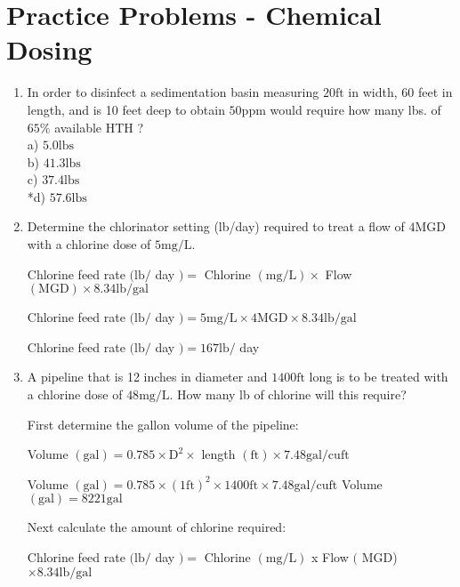 \section*{Practice Problems - Chemical Dosing} 
\begin{enumerate}

\item In order to disinfect a sedimentation basin measuring $20 \mathrm{ft}$ in width, 60 feet in length, and is 10 feet deep to obtain $50 \mathrm{ppm}$ would require how many lbs. of $65 \%$ available $\mathrm{HTH}$ ?\\
a) $5.0 \mathrm{lbs}$\\
b) $41.3 \mathrm{lbs}$\\
c) $37.4 \mathrm{lbs}$\\
*d) $57.6 \mathrm{lbs}$\\

\item Determine the chlorinator setting (lb/day) required to treat a flow of $4 \mathrm{MGD}$ with a chlorine dose of $5 \mathrm{mg} / \mathrm{L}$.

Chlorine feed rate $(\mathrm{lb} /$ day $)=$ Chlorine $(\mathrm{mg} / \mathrm{L}) \times$ Flow $(\mathrm{MGD}) \times 8.34 \mathrm{lb} / \mathrm{gal}$

Chlorine feed rate $(\mathrm{lb} /$ day $)=5 \mathrm{mg} / \mathrm{L} \times 4 \mathrm{MGD} \times 8.34 \mathrm{lb} / \mathrm{gal}$

Chlorine feed rate $(\mathrm{lb} /$ day $)=167 \mathrm{lb} /$ day

\item A pipeline that is 12 inches in diameter and $1400 \mathrm{ft}$ long is to be treated with a chlorine dose of $48 \mathrm{mg} / \mathrm{L}$. How many lb of chlorine will this require?

First determine the gallon volume of the pipeline:

Volume $(\mathrm{gal})=0.785 \times \mathrm{D}^{2} \times$ length $(\mathrm{ft}) \times 7.48 \mathrm{gal} / \mathrm{cu} \mathrm{ft}$

Volume $(\mathrm{gal})=0.785 \times(1 \mathrm{ft})^{2} \times 1400 \mathrm{ft} \times 7.48 \mathrm{gal} / \mathrm{cu} \mathrm{ft}$ Volume $(\mathrm{gal})=8221 \mathrm{gal}$

Next calculate the amount of chlorine required:

Chlorine feed rate $(\mathrm{lb} /$ day $)=$ Chlorine $(\mathrm{mg} / \mathrm{L})$ x Flow $($ MGD) $\times 8.34 \mathrm{lb} / \mathrm{gal}$


\end{enumerate}
